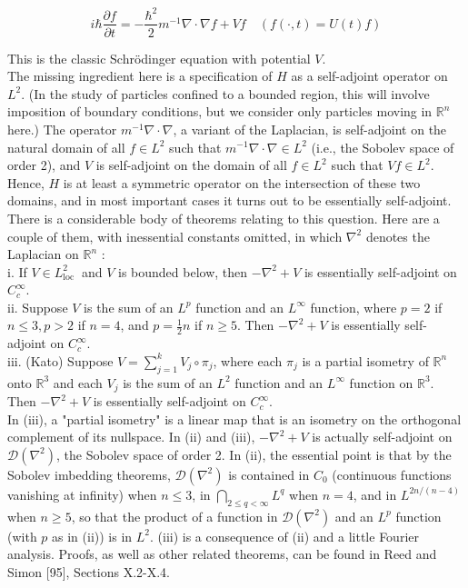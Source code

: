 \documentclass[10pt, letterpaper]{article}
\begin{document}
$$
i \hbar \frac{\partial f}{\partial t}=-\frac{\hbar^{2}}{2} m^{-1} \nabla \cdot \nabla f+V f \quad(f(\cdot, t)=U(t) f)
$$

This is the classic Schrödinger equation with potential $V$.\\
The missing ingredient here is a specification of $H$ as a self-adjoint operator on $L^{2}$. (In the study of particles confined to a bounded region, this will involve imposition of boundary conditions, but we consider only particles moving in $\mathbb{R}^{n}$ here.) The operator $m^{-1} \nabla \cdot \nabla$, a variant of the Laplacian, is self-adjoint on the natural domain of all $f \in L^{2}$ such that $m^{-1} \nabla \cdot \nabla \in L^{2}$ (i.e., the Sobolev space of\\
order 2), and $V$ is self-adjoint on the domain of all $f \in L^{2}$ such that $V f \in L^{2}$. Hence, $H$ is at least a symmetric operator on the intersection of these two domains, and in most important cases it turns out to be essentially self-adjoint. There is a considerable body of theorems relating to this question. Here are a couple of them, with inessential constants omitted, in which $\nabla^{2}$ denotes the Laplacian on $\mathbb{R}^{n}$ :\\
i. If $V \in L_{\text {loc }}^{2}$ and $V$ is bounded below, then $-\nabla^{2}+V$ is essentially self-adjoint on $C_{c}^{\infty}$.\\
ii. Suppose $V$ is the sum of an $L^{p}$ function and an $L^{\infty}$ function, where $p=2$ if $n \leq 3, p>2$ if $n=4$, and $p=\frac{1}{2} n$ if $n \geq 5$. Then $-\nabla^{2}+V$ is essentially self-adjoint on $C_{c}^{\infty}$.\\
iii. (Kato) Suppose $V=\sum_{j=1}^{k} V_{j} \circ \pi_{j}$, where each $\pi_{j}$ is a partial isometry of $\mathbb{R}^{n}$ onto $\mathbb{R}^{3}$ and each $V_{j}$ is the sum of an $L^{2}$ function and an $L^{\infty}$ function on $\mathbb{R}^{3}$. Then $-\nabla^{2}+V$ is essentially self-adjoint on $C_{c}^{\infty}$.\\
In (iii), a "partial isometry" is a linear map that is an isometry on the orthogonal complement of its nullspace. In (ii) and (iii), $-\nabla^{2}+V$ is actually self-adjoint on $\mathcal{D}\left(\nabla^{2}\right)$, the Sobolev space of order 2. In (ii), the essential point is that by the Sobolev imbedding theorems, $\mathcal{D}\left(\nabla^{2}\right)$ is contained in $C_{0}$ (continuous functions vanishing at infinity) when $n \leq 3$, in $\bigcap_{2 \leq q<\infty} L^{q}$ when $n=4$, and in $L^{2 n /(n-4)}$ when $n \geq 5$, so that the product of a function in $\mathcal{D}\left(\nabla^{2}\right)$ and an $L^{p}$ function (with $p$ as in (ii)) is in $L^{2}$. (iii) is a consequence of (ii) and a little Fourier analysis. Proofs, as well as other related theorems, can be found in Reed and Simon [95], Sections X.2-X.4.
\end{document}
